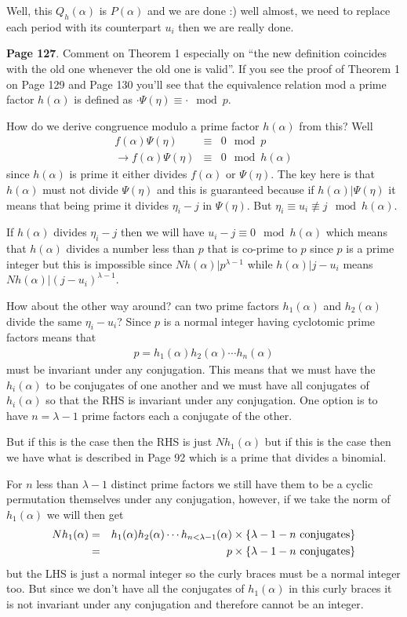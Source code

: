 \documentclass[aps,preprint,preprintnumbers,nofootinbib,showpacs,prd]{revtex4-1}
\newcommand{\nbea}{\begin{eqnarray*}}
\newcommand{\neea}{\end{eqnarray*}}
\begin{document}
Well, this $Q_h(\alpha)$ is $P(\alpha)$ and we are done :) well almost, we need to replace each period with its counterpart $u_i$ then we are really done.


{\bf Page 127}. Comment on Theorem 1 especially on ``the new definition coincides with the old one whenever the old one is valid''. If you see the proof of Theorem 1 on Page 129 and Page 130 you'll see that the equivalence relation mod a prime factor $h(\alpha)$ is defined as $\cdot\Psi(\eta) \equiv \cdot \mod{p}$.

How do we derive congruence modulo a prime factor $h(\alpha)$ from this? Well
%
\nbea
f(\alpha) \Psi(\eta) & \equiv & 0 \mod{p} \\
\to f(\alpha) \Psi(\eta) & \equiv & 0 \mod{h(\alpha)}
\neea
%
since $h(\alpha)$ is prime it either divides $f(\alpha)$ or $\Psi(\eta)$. The key here is that $h(\alpha)$ must not divide $\Psi(\eta)$ and this is guaranteed because if $h(\alpha)|\Psi(\eta)$ it means that being prime it divides $\eta_i - j$ in $\Psi(\eta)$. But $\eta_i \equiv u_i \not\equiv j \mod{h(\alpha)}$.

If $h(\alpha)$ divides $\eta_i - j$ then we will have $u_i - j \equiv 0 \mod{h(\alpha)}$ which means that $h(\alpha)$ divides a number less than $p$ that is co-prime to $p$ since $p$ is a prime integer but this is impossible since $Nh(\alpha)|p^{\lambda - 1}$ while $h(\alpha)|j - u_i$ means $Nh(\alpha)| (j - u_i)^{\lambda - 1}$.

How about the other way around? can two prime factors $h_1(\alpha)$ and $h_2(\alpha)$ divide the same $\eta_i - u_i$? Since $p$ is a normal integer having cyclotomic prime factors means that 
%
\nbea
p = h_1(\alpha)h_2(\alpha) \cdots h_n(\alpha)
\neea
%
must be invariant under any conjugation. This means that we must have the $h_i(\alpha)$ to be conjugates of one another and we must have all conjugates of $h_i(\alpha)$ so that the RHS is invariant under any conjugation. One option is to have $n = \lambda - 1$ prime factors each a conjugate of the other.

But if this is the case then the RHS is just $Nh_1(\alpha)$ but if this is the case then we have what is described in Page 92 which is a prime that divides a binomial.

For $n$ less than $\lambda - 1$ distinct prime factors we still have them to be a cyclic permutation themselves under any conjugation, however, if we take the norm of $h_1(\alpha)$ we will then get 
%
\nbea
Nh_1(\alpha) & = & h_1(\alpha)h_2(\alpha) \cdots h_{n < \lambda - 1}(\alpha) \times \{\lambda - 1 - n~{\rm conjugates}\} \\
& = & p \times \{\lambda - 1 - n~{\rm conjugates}\}
\neea
%
but the LHS is just a normal integer so the curly braces must be a normal integer too. But since we don't have all the conjugates of $h_1(\alpha)$ in this curly braces it is not invariant under any conjugation and therefore cannot be an integer.
\end{document}
